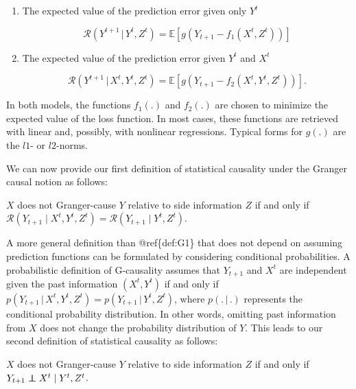\documentclass[]{book}
\providecommand{\tightlist}{%
  \setlength{\itemsep}{0pt}\setlength{\parskip}{0pt}}
\theoremstyle{definition}
\theoremstyle{definition}
\theoremstyle{definition}
\theoremstyle{remark}
\let\BeginKnitrBlock\begin \let\EndKnitrBlock\end
\begin{document}
\begin{enumerate}
\def\labelenumi{\arabic{enumi}.}
\tightlist
\item
  The expected value of the prediction error given only \(Y^t\)

  \begin{equation}
   \mathcal{R}(Y^{t+1} \, | \, Y^t,Z^t) = \mathbb{E}[g(Y_{t+1} - f_1(X^{t},Z^t))]
  \end{equation}
\item
  The expected value of the prediction error given \(Y^t\) and \(X^t\)

  \begin{equation}
   \mathcal{R}(Y^{t+1} \, | \, X^{t},Y^t,Z^t) = \mathbb{E}[g(Y_{t+1} - f_2(X^{t},Y^t,Z^t))].
  \end{equation}
\end{enumerate}

In both models, the functions \(f_1(.)\) and \(f_2(.)\) are chosen to
minimize the expected value of the loss function. In most cases, these
functions are retrieved with linear and, possibly, with nonlinear
regressions. Typical forms for \(g(.)\) are the \(l1\)- or \(l2\)-norms.

We can now provide our first definition of statistical causality under
the Granger causal notion as follows:

\BeginKnitrBlock{definition}
\protect\hypertarget{def:G1}{}{\label{def:G1} }\(X\) does not Granger-cause
\(Y\) relative to side information \(Z\) if and only if
\(\mathcal{R}(Y_{t+1} \; | \; X^t, Y^t, Z^t) = \mathcal{R}(Y_{t+1} \; | \; Y^t, Z^t)\).
\EndKnitrBlock{definition}

A more general definition than @ref\{def:G1\} that does not depend on
assuming prediction functions can be formulated by considering
conditional probabilities. A probabilistic definition of G-causality
assumes that \(Y_{t+1}\) and \(X^{t}\) are independent given the past
information \((X^{t}, Y^{t})\) if and only if
\(p(Y_{t+1} \, | \, X^{t}, Y^{t}, Z^{t}) = p(Y_{t+1} \, | \, Y^{t}, Z^{t})\),
where \(p(. \, | \, .)\) represents the conditional probability
distribution. In other words, omitting past information from \(X\) does
not change the probability distribution of \(Y\). This leads to our
second definition of statistical causality as follows:
\BeginKnitrBlock{definition}
\protect\hypertarget{def:G2}{}{\label{def:G2} }\(X\) does not Granger-cause
\(Y\) relative to side information \(Z\) if and only if
\(Y_{t+1} \perp\!\!\!\!\perp X^{t} \; | \; Y^{t}, Z^{t}\).
\EndKnitrBlock{definition}
\end{document}
